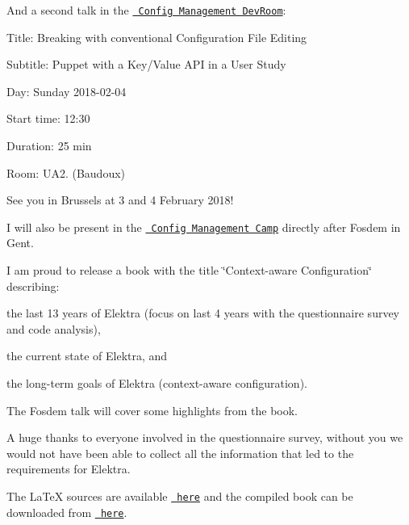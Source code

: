 And a second talk in the \href{https://fosdem.org/2018/schedule/event/puppet_key_value/}{\texttt{ Config Management Dev\+Room}}\+:


\begin{DoxyItemize}
\item Title\+: Breaking with conventional Configuration File Editing
\item Subtitle\+: Puppet with a Key/\+Value A\+PI in a User Study
\item Day\+: Sunday 2018-\/02-\/04
\item Start time\+: 12\+:30
\item Duration\+: 25 min
\item Room\+: U\+A2. (Baudoux)
\end{DoxyItemize}

See you in Brussels at 3 and 4 February 2018!

I will also be present in the \href{http://cfgmgmtcamp.eu/}{\texttt{ Config Management Camp}} directly after Fosdem in Gent.

I am proud to release a book with the title \char`\"{}\+Context-\/aware Configuration\char`\"{} describing\+:


\begin{DoxyItemize}
\item the last 13 years of Elektra (focus on last 4 years with the questionnaire survey and code analysis),
\item the current state of Elektra, and
\item the long-\/term goals of Elektra (context-\/aware configuration).
\end{DoxyItemize}

The Fosdem talk will cover some highlights from the book.

A huge thanks to everyone involved in the questionnaire survey, without you we would not have been able to collect all the information that led to the requirements for Elektra.

The La\+TeX sources are available \href{https://book.libelektra.org}{\texttt{ here}} and the compiled book can be downloaded from \href{https://www.libelektra.org/ftp/elektra/publications/raab2017context.pdf}{\texttt{ here}}.


